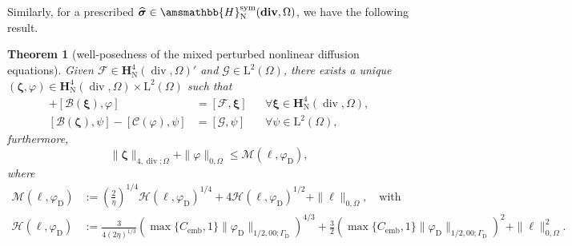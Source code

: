 \documentclass[fleqn,a4paper]{cas-sc}
\newcommand\vdiv{\mathop{\mathrm{div}}\nolimits}
\newcommand\bdiv{\mathop{\mathbf{div}}\nolimits}
\newcommand{\bxi}{\boldsymbol{\xi}}
\newcommand{\bzeta}{\boldsymbol{\zeta}}
\newcommand{\0}{\boldsymbol{0}}
\newcommand\cC{\mathcal{C}}
\newcommand\cG{\mathcal{G}}
\newcommand\cF{\mathcal{F}}
\newcommand\bbH{\amsmathbb{H}}
\newcommand\bH{\mathbf{H}}
\newcommand\rL{\mathrm{L}}
\newcommand\bsigma{\boldsymbol{\sigma}}
\numberwithin{equation}{section}
\numberwithin{figure}{section}
\newtheorem{theorem}{Theorem}[section]
\begin{document}
Similarly, for a prescribed $\widehat{\bsigma} \in \bbH^{\mathrm{sym}}_{\mathrm{N}}(\bdiv,\Omega)$, we have the following result.
\begin{theorem}[well-posedness of the mixed perturbed nonlinear diffusion equations]\label{th:well-posed-diff}
Given $\cF \in \bH^{4}_{\mathrm{N}}(\vdiv,\Omega)'$ and $\cG \in \rL^2(\Omega)$, there exists a unique $( \bzeta, \varphi) \in  \bH^{4}_{\mathrm{N}}(\vdiv,\Omega) \times \rL^2(\Omega)$ such that
    \begin{align*}
      [\mathcal{A}_{\widehat{\bsigma}}(\bzeta), \bxi] + [\mathcal{B}(\bxi), \varphi] &= [\cF,\bxi] &&\forall \bxi \in \bH^{4}_{\mathrm{N}}(\vdiv,\Omega),\\
     [\mathcal{B}(\bzeta), \psi] - [\cC(\varphi), \psi] &= [\cG,\psi] &&\forall \psi \in \rL^2(\Omega),  
\end{align*}   %
 furthermore,
    \begin{equation}\label{eq:apriori_bound}
        \|\bzeta\|_{{4,\vdiv;\Omega}} + \|\varphi\|_{0, \Omega} \le \mathcal{M}(\ell, \varphi_{\mathrm{D}}),
    \end{equation}
where 
    \begin{subequations}\begin{align}\label{eq:def_M_data}
        \mathcal{M}(\ell, \varphi_{\mathrm{D}})& := \left( \frac{2}{\eta} \right)^{1/4} \mathcal{H}(\ell, \varphi_{\mathrm{D}})^{1/4} + 4 \mathcal{H}(\ell, \varphi_{\mathrm{D}})^{1/2} + \|\ell\|_{0,\Omega},\quad \text{with}
\\ \label{eq:def_F_data}
        \mathcal{H}(\ell, \varphi_{\mathrm{D}}) &:= \frac{3}{4(2\eta)^{1/3}} \left( \max\{C_{\mathrm{emb}}, 1\} \|\varphi_{\mathrm{D}}\|_{1/2,00;\Gamma_{\mathrm{D}}} \right)^{4/3} + \frac{3}{2} \left( \max\{C_{\mathrm{emb}}, 1\} \|\varphi_{\mathrm{D}}\|_{1/2,00;\Gamma_{\mathrm{D}}} \right)^2 + \|\ell\|_{0,\Omega}^2.
    \end{align}\end{subequations}
\end{theorem}
\end{document}
